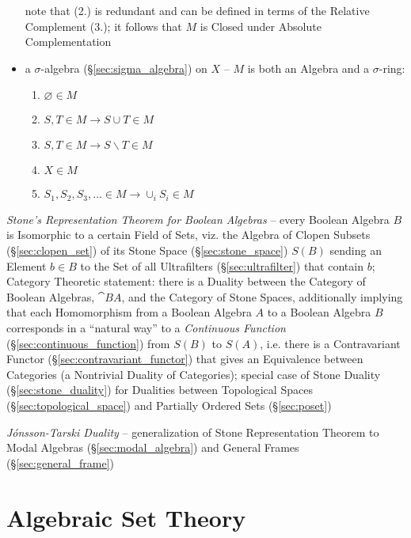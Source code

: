 \begin{itemize}
    note that (2.) is redundant and can be defined in terms of the Relative
    Complement (3.); it follows that $M$ is Closed under Absolute
    Complementation
  \item a $\sigma$-algebra (\S\ref{sec:sigma_algebra}) on $X$ -- $M$ is both an
    Algebra and a $\sigma$-ring:
    \begin{enumerate}
      \item $\varnothing \in M$
      \item $S, T \in M \to S \cup T \in M$
      \item $S, T \in M \to S \backslash T \in M$
      \item $X \in M$
      \item $S_1, S_2, S_3, \ldots \in M \to \cup_i S_i \in M$
    \end{enumerate}
\end{itemize}

\emph{Stone's Representation Theorem for Boolean Algebras} -- every Boolean
Algebra $B$ is Isomorphic to a certain Field of Sets, viz. the Algebra of Clopen
Subsets (\S\ref{sec:clopen_set}) of its Stone Space (\S\ref{sec:stone_space})
$\xspace{S}(B)$ sending an Element $b \in B$ to the Set of all Ultrafilters
(\S\ref{sec:ultrafilter}) that contain $b$; Category Theoretic statement: there
is a Duality between the Category of Boolean Algebras, $\cat{BA}$, and the
Category of Stone Spaces, additionally implying that each Homomorphism from a
Boolean Algebra $A$ to a Boolean Algebra $B$ corresponds in a ``natural way'' to
a \emph{Continuous Function} (\S\ref{sec:continuous_function}) from $S(B)$ to
$S(A)$, i.e. there is a Contravariant Functor
(\S\ref{sec:contravariant_functor}) that gives an Equivalence between Categories
(a Nontrivial Duality of Categories); special case of Stone Duality
(\S\ref{sec:stone_duality}) for Dualities between Topological Spaces
(\S\ref{sec:topological_space}) and Partially Ordered Sets (\S\ref{sec:poset})

\fist \emph{J\'onsson-Tarski Duality} --
generalization of Stone Representation Theorem to Modal Algebras
(\S\ref{sec:modal_algebra}) and General Frames (\S\ref{sec:general_frame})



\section{Algebraic Set Theory}\label{sec:algebraic_set_theory}

